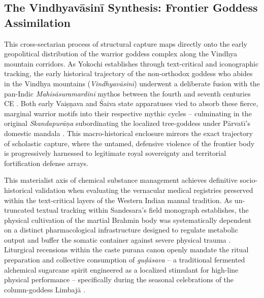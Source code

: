 \documentclass[11pt,twoside,letterpaper]{article}
\begin{document}
\subsection{The Vindhyavāsinī Synthesis: Frontier Goddess Assimilation}
This cross-sectarian process of structural capture maps directly onto the early geopolitical distribution of the warrior goddess complex along the Vindhya mountain corridors. As Yokochi establishes through text-critical and iconographic tracking, the early historical trajectory of the non-orthodox goddess who abides in the Vindhya mountains (\textit{Vindhyavāsinī}) underwent a deliberate fusion with the pan-Indic \textit{Mahisāsuramardinī} mythos between the fourth and seventh centuries CE \citep{Yokochi1999}. Both early Vaiṣṇava and Śaiva state apparatuses vied to absorb these fierce, marginal warrior motifs into their respective mythic cycles -- culminating in the original \textit{Skandapurāṇa} subordinating the localized tree-goddess under Pārvatī’s domestic mandala \citep{Yokochi1999}. This macro-historical enclosure mirrors the exact trajectory of scholastic capture, where the untamed, defensive violence of the frontier body is progressively harnessed to legitimate royal sovereignty and territorial fortification defense arrays.

This materialist axis of chemical substance management achieves definitive socio-historical validation when evaluating the vernacular medical registries preserved within the text-critical layers of the Western Indian manual tradition. As un-truncated textual tracking within Sandesara’s field monograph establishes, the physical cultivation of the martial Brahmin body was systematically dependent on a distinct pharmacological infrastructure designed to regulate metabolic output and buffer the somatic container against severe physical trauma \citep{Sandesara1948}. Liturgical recensions within the caste purana canon openly mandate the ritual preparation and collective consumption of \textit{guḍāsava} – a traditional fermented alchemical sugarcane spirit engineered as a localized stimulant for high-line physical performance – specifically during the seasonal celebrations of the column-goddess Limbajā \citep{Sandesara1948}. 
\end{document}
